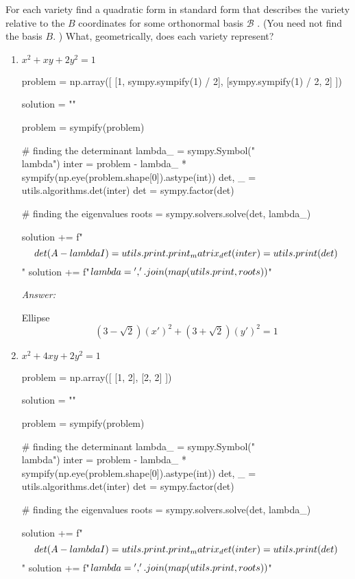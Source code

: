 \documentclass[letterpaper]{article}
\newcommand{\ans}{\textit{Answer: }}
\newenvironment{question}[2][Question]{\begin{trivlist}
\item[\hskip \labelsep {\bfseries #1}\hskip \labelsep {\bfseries #2.}]}{\end{trivlist}}
\begin{document}
\begin{question}{6.108}
  For each variety find a quadratic form in standard form that describes the
  variety relative to the $B$ coordinates for some orthonormal basis $\mathcal{B}$ . (You
  need not find the basis $B .$ ) What, geometrically, does each variety represent?

  \begin{enumerate}[label=(\alph*)]
    \item $x^{2}+x y+2 y^{2}=1$
    \begin{pycode}
problem = np.array([
  [1, sympy.sympify(1) / 2],
  [sympy.sympify(1) / 2, 2]
])

solution = ""

problem = sympify(problem)

# finding the determinant 
lambda_ = sympy.Symbol("\\lambda")
inter = problem - lambda_ * sympify(np.eye(problem.shape[0]).astype(int))
det, _ = utils.algorithms.det(inter)
det = sympy.factor(det)

# finding the eigenvalues
roots = sympy.solvers.solve(det, lambda_)

solution += f"$$\\det(A - \\lambda I) = {utils.print.print_matrix_det(inter)} = {utils.print(det)}$$\n"
solution += f"$\\lambda = {', '.join(map(utils.print, roots))}$\n"

    \end{pycode}

    \ans

    Ellipse
    $$(3 - \sqrt{2})(x')^2 + (3 + \sqrt{2})(y')^2 = 1$$


    \item $x^{2}+4 x y+2 y^{2}=1$
    \begin{pycode}
problem = np.array([
  [1, 2],
  [2, 2]
])

solution = ""

problem = sympify(problem)

# finding the determinant 
lambda_ = sympy.Symbol("\\lambda")
inter = problem - lambda_ * sympify(np.eye(problem.shape[0]).astype(int))
det, _ = utils.algorithms.det(inter)
det = sympy.factor(det)

# finding the eigenvalues
roots = sympy.solvers.solve(det, lambda_)

solution += f"$$\\det(A - \\lambda I) = {utils.print.print_matrix_det(inter)} = {utils.print(det)}$$\n"
solution += f"$\\lambda = {', '.join(map(utils.print, roots))}$\n"


\end{pycode}
\end{enumerate}
\end{question}
\end{document}
